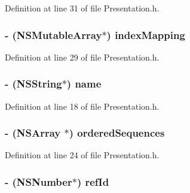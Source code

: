 Definition at line 31 of file Presentation.h.

\hypertarget{interface_presentation_a495c856cb3552e081cab733749b15daa}{
\subsubsection[{indexMapping}]{\setlength{\rightskip}{0pt plus 5cm}-\/ (NSMutableArray$\ast$) indexMapping}}
\label{interface_presentation_a495c856cb3552e081cab733749b15daa}


Definition at line 29 of file Presentation.h.

\hypertarget{interface_presentation_a4b93d352d2fca75b34e1b5a50e03f587}{
\subsubsection[{name}]{\setlength{\rightskip}{0pt plus 5cm}-\/ (NSString$\ast$) name}}
\label{interface_presentation_a4b93d352d2fca75b34e1b5a50e03f587}


Definition at line 18 of file Presentation.h.

\hypertarget{interface_presentation_ae43a6a9c4f99b7da4aa3dec09eef7566}{
\subsubsection[{orderedSequences}]{\setlength{\rightskip}{0pt plus 5cm}-\/ (NSArray $\ast$) orderedSequences}}
\label{interface_presentation_ae43a6a9c4f99b7da4aa3dec09eef7566}


Definition at line 24 of file Presentation.h.

\hypertarget{interface_presentation_ae24e2568d0d3a40bebefe304cb92656c}{
\subsubsection[{refId}]{\setlength{\rightskip}{0pt plus 5cm}-\/ (NSNumber$\ast$) refId}}
\label{interface_presentation_ae24e2568d0d3a40bebefe304cb92656c}


